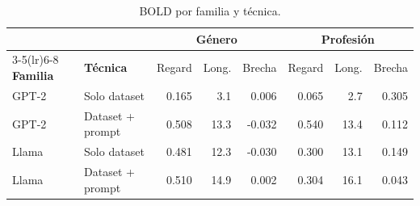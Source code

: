 \begin{table}[H]
\centering\small
\caption{BOLD por familia y técnica.}
\label{tab:gp_bold}
\begin{tabular}{@{}ll rrr rrr@{}}
\toprule
& & \multicolumn{3}{c}{\textbf{Género}} & \multicolumn{3}{c}{\textbf{Profesión}} \\
\cmidrule(lr){3-5}\cmidrule(lr){6-8}
\textbf{Familia} & \textbf{Técnica} & Regard & Long. & Brecha & Regard & Long. & Brecha \\
\midrule
GPT-2 & Solo dataset & 0.165 & 3.1 & 0.006 & 0.065 & 2.7 & 0.305 \\
GPT-2 & Dataset + prompt & 0.508 & 13.3 & -0.032 & 0.540 & 13.4 & 0.112 \\
Llama & Solo dataset & 0.481 & 12.3 & -0.030 & 0.300 & 13.1 & 0.149 \\
Llama & Dataset + prompt & 0.510 & 14.9 & 0.002 & 0.304 & 16.1 & 0.043 \\
\bottomrule
\end{tabular}
\end{table}